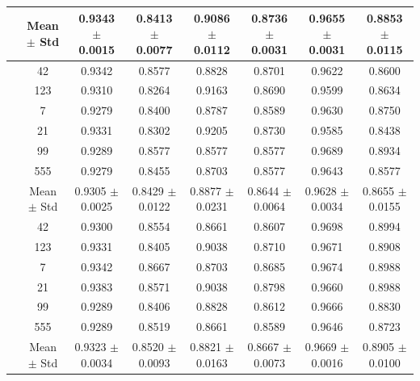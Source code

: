 \documentclass{article}
\begin{document}
\begin{table}[htbp]
{\begin{tabular}{>{\raggedright\arraybackslash}p{3.2cm}ccccccc}
			\cmidrule(lr){2-8}
			
			& Mean $\pm$ Std
			& 0.9343 $\pm$ 0.0015
			& 0.8413 $\pm$ 0.0077
			& 0.9086 $\pm$ 0.0112
			& 0.8736 $\pm$ 0.0031
			& 0.9655 $\pm$ 0.0031
			& 0.8853 $\pm$ 0.0115 \\
			
			\midrule
			
			
			\multirow{8}{*}{Without Contrastive Loss}
			& 42  & 0.9342 & 0.8577 & 0.8828 & 0.8701 & 0.9622 & 0.8600 \\
			& 123 & 0.9310 & 0.8264 & 0.9163 & 0.8690 & 0.9599 & 0.8634 \\
			& 7   & 0.9279 & 0.8400 & 0.8787 & 0.8589 & 0.9630 & 0.8750 \\
			& 21  & 0.9331 & 0.8302 & 0.9205 & 0.8730 & 0.9585 & 0.8438 \\
			& 99  & 0.9289 & 0.8577 & 0.8577 & 0.8577 & 0.9689 & 0.8934 \\
			& 555 & 0.9279 & 0.8455 & 0.8703 & 0.8577 & 0.9643 & 0.8577 \\
			
			\cmidrule(lr){2-8}
			
			& Mean $\pm$ Std
			& 0.9305 $\pm$ 0.0025
			& 0.8429 $\pm$ 0.0122
			& 0.8877 $\pm$ 0.0231
			& 0.8644 $\pm$ 0.0064
			& 0.9628 $\pm$ 0.0034
			& 0.8655 $\pm$ 0.0155 \\
			
			\midrule
			
			\multirow{8}{*}{Without Cross Attention}
			& 42  & 0.9300 & 0.8554 & 0.8661 & 0.8607 & 0.9698 & 0.8994 \\
			& 123 & 0.9331 & 0.8405 & 0.9038 & 0.8710 & 0.9671 & 0.8908 \\
			& 7   & 0.9342 & 0.8667 & 0.8703 & 0.8685 & 0.9674 & 0.8988 \\
			& 21  & 0.9383 & 0.8571 & 0.9038 & 0.8798 & 0.9660 & 0.8988 \\
			& 99  & 0.9289 & 0.8406 & 0.8828 & 0.8612 & 0.9666 & 0.8830 \\
			& 555 & 0.9289 & 0.8519 & 0.8661 & 0.8589 & 0.9646 & 0.8723 \\
			
			\cmidrule(lr){2-8}
			
			& Mean $\pm$ Std
			& 0.9323 $\pm$ 0.0034
			& 0.8520 $\pm$ 0.0093
			& 0.8821 $\pm$ 0.0163
			& 0.8667 $\pm$ 0.0073
			& 0.9669 $\pm$ 0.0016
			& 0.8905 $\pm$ 0.0100 \\
			
		\end{tabular}%
	}
	
\end{table}
	

	
\end{document}
